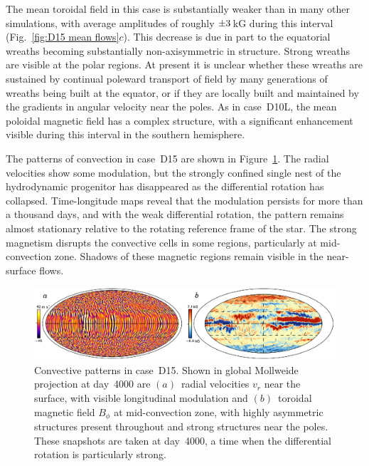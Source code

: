 The mean toroidal field in this case is substantially weaker than in
many other simulations, with average amplitudes of roughly $\pm
3\thinspace$kG during this interval (Fig.~\ref{fig:D15 mean
 flows}$c$).  This decrease is due in part to
the equatorial wreaths becoming substantially non-axisymmetric in structure.
Strong wreaths are visible at the polar regions.  At present it is
unclear whether these wreaths are sustained by continual poleward
transport of field by many generations of wreaths being built at the
equator, or if they are locally built and maintained by the gradients
in angular velocity near the poles.  As in case~D10L, the mean
poloidal magnetic field has a complex structure, with a significant
enhancement visible during this interval in the southern hemisphere.

The patterns of  convection in case~D15 are shown in
Figure~\ref{fig:D15 convection}.  The radial velocities show some
modulation, but the strongly confined single nest of the hydrodynamic
progenitor has disappeared as the differential rotation has
collapsed.  Time-longitude maps reveal that the modulation persists
for more than a thousand days, and with the weak differential
rotation, the pattern remains almost stationary relative to the
rotating reference frame of the star.  The strong magnetism disrupts
the convective cells in some regions, particularly at mid-convection
zone.  Shadows of these magnetic regions remain visible in the
near-surface flows.

\begin{figure}[!t]
  \begin{center}
    \includegraphics[width=\linewidth]{figs/chapter_8/case_D15_patterns.eps}
  \end{center}
  \caption[Convective patterns in case~D15]
          {Convective patterns in case~D15.  Shown in global Mollweide
            projection at day~4000 are $(a)$~radial velocities $v_r$
            near the surface, with visible longitudinal modulation and
            $(b)$~toroidal magnetic field $B_\phi$ at mid-convection
            zone, with highly asymmetric structures present throughout
            and strong structures near the poles.  These snapshots are
            taken at day~4000, a time when the differential rotation is
            particularly strong.
          \label{fig:D15 convection}}
\end{figure}

